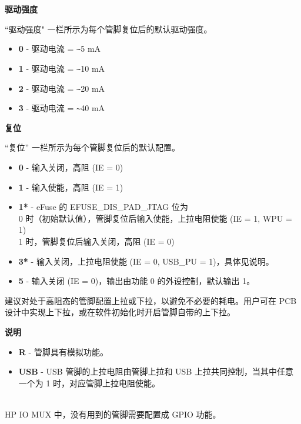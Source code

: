 \documentclass[main\_\_CN.tex]{subfiles}
\begin{document}
\textbf{驱动强度}

``驱动强度" 一栏所示为每个管脚复位后的默认驱动强度。

\begin{itemize}
\item \textbf{0} - 驱动电流 = \verb+~+5 mA
\item \textbf{1} - 驱动电流 = \verb+~+10 mA
\item \textbf{2} - 驱动电流 = \verb+~+20 mA
\item \textbf{3} - 驱动电流 = \verb+~+40 mA
\end{itemize}

    \textbf{复位}

    “复位” 一栏所示为每个管脚复位后的默认配置。

        \begin{itemize}
        \item \textbf{0} - 输入关闭，高阻 (IE = 0)
        \item \textbf{1} - 输入使能，高阻 (IE = 1)
        \item \textbf{1*} - eFuse 的 EFUSE\_DIS\_PAD\_JTAG 位为
        \\\hspace{1.8 em}0 时（初始默认值），管脚复位后输入使能，上拉电阻使能 (IE = 1, WPU = 1)
        \\\hspace{1.8 em}1 时，管脚复位后输入关闭，高阻 (IE = 0)
        \item \textbf{3*} - 输入关闭，上拉电阻使能 (IE = 0, USB\_PU = 1)，具体见说明。
        \item \textbf{5} - 输入关闭 (IE = 0)，输出由功能 0 的外设控制，默认输出 1。
    \end{itemize}

    建议对处于高阻态的管脚配置上拉或下拉，以避免不必要的耗电。用户可在 PCB 设计中实现上下拉，或在软件初始化时开启管脚自带的上下拉。

    \textbf{说明}

    \begin{itemize}
        \item \textbf{R} - 管脚具有模拟功能。
        \item \textbf{USB} - USB 管脚的上拉电阻由管脚上拉和 USB 上拉共同控制，当其中任意一个为 1 时，对应管脚上拉电阻使能。
    \end{itemize}

\begin{importantlisting}\\
    HP IO MUX 中，没有用到的管脚需要配置成 GPIO 功能。
\end{importantlisting}
\end{document}
